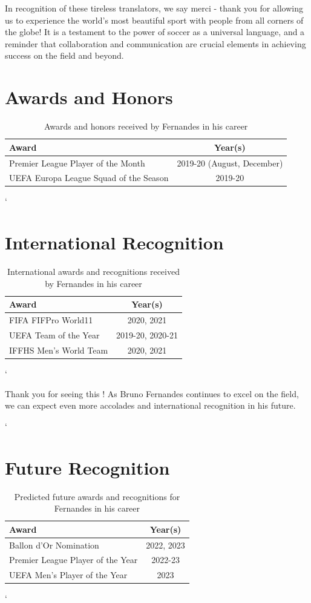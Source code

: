 \documentclass{article}
\begin{document}
In recognition of these tireless translators, we say merci - thank you for allowing us to experience the world's most beautiful sport with people from all corners of the globe! It is a testament to the power of soccer as a universal language, and a reminder that collaboration and communication are crucial elements in achieving success on the field and beyond.

\section*{Awards and Honors}
\begin{table}[h]
  \centering
  \begin{tabular}{|l|c|}
     \hline
     \textbf{Award} & \textbf{Year(s)} \\ \hline
     Premier League Player of the Month & 2019-20 (August, December) \\
     UEFA Europa League Squad of the Season & 2019-20 \\
     \hline
  \end{tabular}
  \caption*{Awards and honors received by Fernandes in his career}
\label{tab:awards_honors}
\end{table}

`\section*{International Recognition} \begin{table}[h] \centering \begin{tabular}{|l|c|} \hline \textbf{Award} & \textbf{Year(s)} \\ \hline FIFA FIFPro World11 & 2020, 2021 \\ UEFA Team of the Year & 2019-20, 2020-21 \\ IFFHS Men's World Team & 2020, 2021 \\ \hline \end{tabular} \caption*{International awards and recognitions received by Fernandes in his career} \label{tab:international_recognition} \end{table}`

Thank you for seeing this !  As Bruno Fernandes continues to excel on the field, we can expect even more accolades and international recognition in his future.

`\section*{Future Recognition} \begin{table}[h] \centering \begin{tabular}{|l|c|} \hline \textbf{Award} & \textbf{Year(s)} \\ \hline Ballon d'Or Nomination & 2022, 2023 \\ Premier League Player of the Year & 2022-23 \\ UEFA Men's Player of the Year & 2023 \\ \hline \end{tabular} \caption*{Predicted future awards and recognitions for Fernandes in his career} \label{tab:future_recognition} \end{table}`
\end{document}
